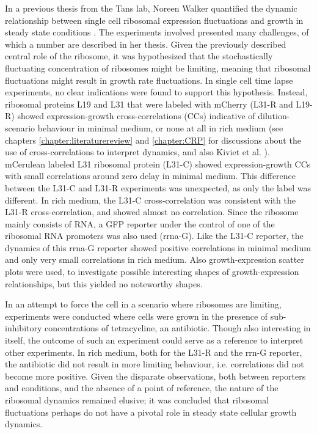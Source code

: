 In a previous thesis from the Tans lab, Noreen Walker 
quantified the dynamic relationship between single cell ribosomal expression fluctuations and growth in steady state conditions \cite{Walker2016t}.
%
The experiments involved presented many challenges, 
of which a number are described in her thesis.
%
%
Given the previously described central role of the ribosome, 
it was hypothesized that the stochastically fluctuating concentration of ribosomes might be limiting, 
meaning that ribosomal fluctuations might result in growth rate fluctuations.
%
In single cell time lapse experiments, no clear indications were found to support this hypothesis.
%
Instead, 
ribosomal proteins L19 and L31 that were labeled with mCherry (L31-R and L19-R)
showed expression-growth cross-correlations (CCs) indicative of dilution-scenario behaviour in minimal medium, or none at all in rich medium (see chapters \ref{chapter:literaturereview} and \ref{chapter:CRP} for discussions about the use of cross-correlations to interpret dynamics, and also Kiviet et al. \cite{Kiviet2014}). 
mCerulean labeled L31 ribosomal protein (L31-C) showed expression-growth CCs with small correlations around zero delay 
in minimal medium.
This difference between the L31-C and L31-R experiments was unexpected, as only the label was different.
%
In rich medium, the L31-C cross-correlation was consistent with the L31-R cross-correlation, and showed almost no correlation.
%
Since the ribosome mainly consists of RNA, 
a GFP reporter under the control of one of the ribosomal RNA promoters was also used (rrna-G).
Like the L31-C reporter, the dynamics of this rrna-G reporter showed positive correlations in minimal medium and only very small correlations in rich medium.
%
%
Also growth-expression scatter plots were used, to investigate possible interesting shapes of growth-expression relationships, but this yielded no noteworthy shapes.

In an attempt to force the cell in a scenario where ribosomes are limiting, experiments were conducted where cells were grown in the presence of sub-inhibitory concentrations of tetracycline, an antibiotic.
%
Though also interesting in itself, the outcome of such an experiment could serve as a reference to interpret other experiments.
%
In rich medium, both for the L31-R and the rrn-G reporter, the antibiotic did not result in more limiting behaviour, i.e. correlations did not become more positive.
%
Given the disparate observations, both between reporters and conditions, 
and the absence of a point of reference,
the nature of the ribosomal dynamics remained elusive; it was concluded that ribosomal fluctuations perhaps do not have a pivotal role in steady state cellular growth dynamics.

